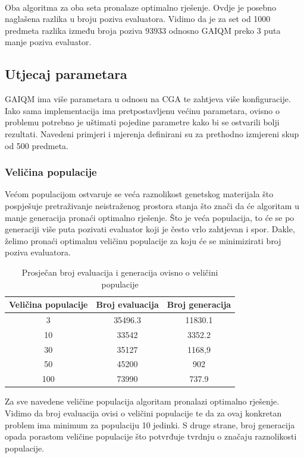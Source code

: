 \documentclass[times, utf8, zavrsni, numeric]{fer}
\begin{document}
\paragraph{}
Oba algoritma za oba seta pronalaze optimalno rješenje. Ovdje je posebno naglašena razlika u broju poziva evaluatora. Vidimo da je za set od 1000 predmeta razlika između broja poziva $93933$ odnosno GAIQM preko 3 puta manje poziva evaluator.

\subsection{Utjecaj parametara}
GAIQM ima više parametara u odnosu na CGA te zahtjeva više konfiguracije. Iako sama implementacija ima pretpostavljenu većinu parametara, ovisno o problemu potrebno je uštimati pojedine parametre kako bi se ostvarili bolji rezultati. Navedeni primjeri i mjerenja definirani su za prethodno izmjereni skup od 500 predmeta.

\subsubsection{Veličina populacije}
Većom populacijom ostvaruje se veća raznolikost genetskog materijala što pospješuje pretraživanje neistraženog prostora stanja što znači da će algoritam u manje generacija pronaći optimalno rješenje. Što je veća populacija, to će se po generaciji više puta pozivati evaluator koji je često vrlo zahtjevan i spor. Dakle, želimo pronaći optimalnu veličinu populacije za koju će se minimizirati broj poziva evaluatora.

\begin{table}[htb]
\caption{Prosječan broj evaluacija i generacija ovisno o veličini populacije}
\centering
\begin{tabular}{ccc} \hline
Veličina populacije & Broj evaluacija & Broj generacija \\ 
\hline
3 &	35496.3 &	11830.1 \\
10	 & 33542 &	3352.2 \\
30 &	35127 &	1168,9 \\
50	 & 45200 &	902 \\
100 &	73990 &	737.9 \\
\hline
\end{tabular}
\end{table}

\newpage

Za sve navedene veličine populacija algoritam pronalazi optimalno rješenje. Vidimo da broj evaluacija ovisi o veličini populacije te da za ovaj konkretan problem ima minimum za populaciju 10 jedinki. S druge strane, broj generacija opada porastom veličine populacije što potvrđuje tvrdnju o značaju raznolikosti populacije.
\end{document}
